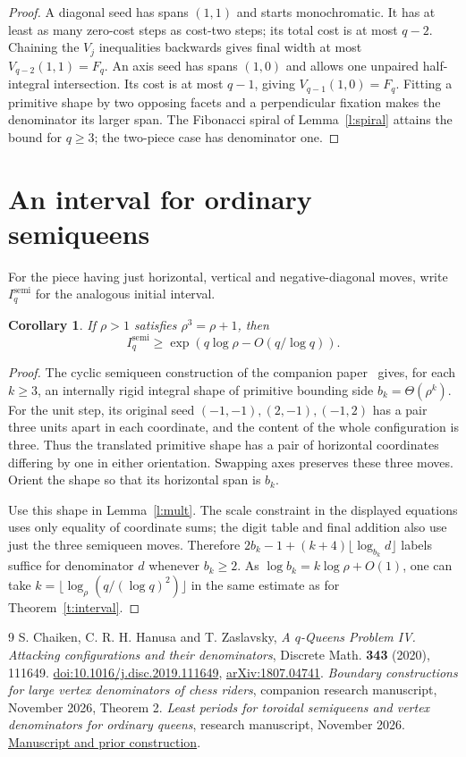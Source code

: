 \documentclass[11pt]{article}
\newtheorem{corollary}[theorem]{Corollary}
\begin{document}
\begin{proof}
A diagonal seed has spans $(1,1)$ and starts monochromatic. It has at least as many zero-cost steps as cost-two steps; its total cost is at most $q-2$. Chaining the $V_j$ inequalities backwards gives final width at most $V_{q-2}(1,1)=F_q$. An axis seed has spans $(1,0)$ and allows one unpaired half-integral intersection. Its cost is at most $q-1$, giving $V_{q-1}(1,0)=F_q$. Fitting a primitive shape by two opposing facets and a perpendicular fixation makes the denominator its larger span. The Fibonacci spiral of Lemma~\ref{l:spiral} attains the bound for $q\ge3$; the two-piece case has denominator one.
\end{proof}

\section{An interval for ordinary semiqueens}
For the piece having just horizontal, vertical and negative-diagonal moves, write $I_q^{\mathrm{semi}}$ for the analogous initial interval.
\begin{corollary}
If $\rho>1$ satisfies $\rho^3=\rho+1$, then
\[
  I_q^{\mathrm{semi}}\ge\exp\!\left(q\log\rho-O(q/\log q)\right).
\]
\end{corollary}
\begin{proof}
The cyclic semiqueen construction of the companion paper~\cite[Thm.~2]{riders} gives, for each $k\ge3$, an internally rigid integral shape of primitive bounding side $b_k=\Theta(\rho^k)$. For the unit step, its original seed $(-1,-1),(2,-1),(-1,2)$ has a pair three units apart in each coordinate, and the content of the whole configuration is three. Thus the translated primitive shape has a pair of horizontal coordinates differing by one in either orientation. Swapping axes preserves these three moves. Orient the shape so that its horizontal span is $b_k$.

Use this shape in Lemma~\ref{l:mult}. The scale constraint in the displayed equations uses only equality of coordinate sums; the digit table and final addition also use just the three semiqueen moves. Therefore $2b_k-1+(k+4)\lfloor\log_{b_k}d\rfloor$ labels suffice for denominator $d$ whenever $b_k\ge2$. As $\log b_k=k\log\rho+O(1)$, one can take $k=\lfloor\log_\rho(q/(\log q)^2)\rfloor$ in the same estimate as for Theorem~\ref{t:interval}.
\end{proof}

\small
\begin{thebibliography}{9}
 S. Chaiken, C. R. H. Hanusa and T. Zaslavsky, \emph{A $q$-Queens Problem IV. Attacking configurations and their denominators}, Discrete Math. \textbf{343} (2020), 111649. \href{https://doi.org/10.1016/j.disc.2019.111649}{doi:10.1016/j.disc.2019.111649}, \href{https://arxiv.org/abs/1807.04741}{arXiv:1807.04741}.
 \emph{Boundary constructions for large vertex denominators of chess riders}, companion research manuscript, November 2026, Theorem 2.
 \emph{Least periods for toroidal semiqueens and vertex denominators for ordinary queens}, research manuscript, November 2026. \href{https://github.com/blakestone-x/math/blob/proof-fleet-2026-11-26/A342372/periods.pdf}{Manuscript and prior construction}.
\end{thebibliography}
\end{document}
